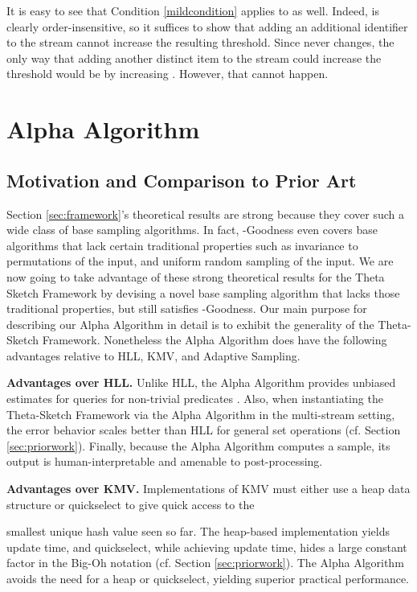 \documentclass{article}
\begin{document}
It is easy to see that Condition \ref{mildcondition} applies to  as well. Indeed,
 is clearly order-insensitive, so it suffices to show that adding an additional identifier to the stream cannot
increase the resulting threshold. Since  never changes,
the only way that adding another distinct item to the stream could increase the threshold would be
by increasing . However, that cannot happen.






\section{Alpha Algorithm}
\label{sec:alpha}
\subsection{Motivation and Comparison to Prior Art}
Section \ref{sec:framework}'s
theoretical results 
are strong because they cover such a wide class of base sampling algorithms. In fact, -Goodness even 
covers base algorithms that lack certain traditional properties such as invariance to permutations of the 
input, and uniform random sampling of the input. We are now going to take advantage of these strong
theoretical results for the Theta Sketch Framework by devising a novel base sampling algorithm that lacks those traditional
properties, but still satisfies -Goodness. Our main purpose for describing our Alpha Algorithm in detail
is to exhibit the generality of the Theta-Sketch Framework. Nonetheless the Alpha Algorithm does have the following advantages relative to HLL, KMV, and Adaptive Sampling.

\medskip
\noindent \textbf{Advantages over HLL.} Unlike HLL,
the Alpha Algorithm provides unbiased estimates for
 queries for non-trivial predicates . Also, when instantiating the Theta-Sketch Framework
via the Alpha Algorithm in the multi-stream setting, the error behavior scales better than HLL for general set operations (cf. Section \ref{sec:priorwork}). Finally,
because the Alpha Algorithm computes a sample, its output is human-interpretable and amenable to post-processing. 

\medskip
\noindent \textbf{Advantages over KMV.} Implementations of KMV must either use a heap data structure or quickselect \cite{quickselect61} to give quick access to the 

smallest unique
hash value seen so far. The heap-based implementation yields  update time, and quickselect, while achieving  update time, hides a large constant factor in the Big-Oh notation
(cf. Section \ref{sec:priorwork}).  
The Alpha Algorithm avoids the need for a heap or quickselect, yielding superior practical performance. 
\end{document}
